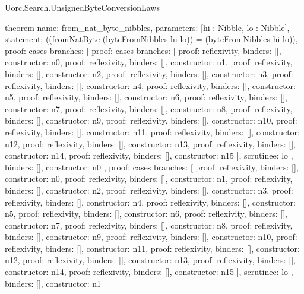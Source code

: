 \begin{lexlean}{Uorc.Search.UnsignedByteConversionLaws}
\begin{semanticmodule}
theorem{
  name: from_nat_byte_nibbles,
  parameters: [hi : Nibble, lo : Nibble],
  statement: ((fromNatByte (byteFromNibbles hi lo)) = (byteFromNibbles hi lo)),
  proof: cases{
    branches: [
      {
        proof: cases{
          branches: [
            {proof: reflexivity{}, binders: [], constructor: n0},
            {proof: reflexivity{}, binders: [], constructor: n1},
            {proof: reflexivity{}, binders: [], constructor: n2},
            {proof: reflexivity{}, binders: [], constructor: n3},
            {proof: reflexivity{}, binders: [], constructor: n4},
            {proof: reflexivity{}, binders: [], constructor: n5},
            {proof: reflexivity{}, binders: [], constructor: n6},
            {proof: reflexivity{}, binders: [], constructor: n7},
            {proof: reflexivity{}, binders: [], constructor: n8},
            {proof: reflexivity{}, binders: [], constructor: n9},
            {proof: reflexivity{}, binders: [], constructor: n10},
            {proof: reflexivity{}, binders: [], constructor: n11},
            {proof: reflexivity{}, binders: [], constructor: n12},
            {proof: reflexivity{}, binders: [], constructor: n13},
            {proof: reflexivity{}, binders: [], constructor: n14},
            {proof: reflexivity{}, binders: [], constructor: n15}
          ],
          scrutinee: lo
        },
        binders: [],
        constructor: n0
      },
      {
        proof: cases{
          branches: [
            {proof: reflexivity{}, binders: [], constructor: n0},
            {proof: reflexivity{}, binders: [], constructor: n1},
            {proof: reflexivity{}, binders: [], constructor: n2},
            {proof: reflexivity{}, binders: [], constructor: n3},
            {proof: reflexivity{}, binders: [], constructor: n4},
            {proof: reflexivity{}, binders: [], constructor: n5},
            {proof: reflexivity{}, binders: [], constructor: n6},
            {proof: reflexivity{}, binders: [], constructor: n7},
            {proof: reflexivity{}, binders: [], constructor: n8},
            {proof: reflexivity{}, binders: [], constructor: n9},
            {proof: reflexivity{}, binders: [], constructor: n10},
            {proof: reflexivity{}, binders: [], constructor: n11},
            {proof: reflexivity{}, binders: [], constructor: n12},
            {proof: reflexivity{}, binders: [], constructor: n13},
            {proof: reflexivity{}, binders: [], constructor: n14},
            {proof: reflexivity{}, binders: [], constructor: n15}
          ],
          scrutinee: lo
        },
        binders: [],
        constructor: n1
}}}
\end{semanticmodule}
\end{lexlean}
